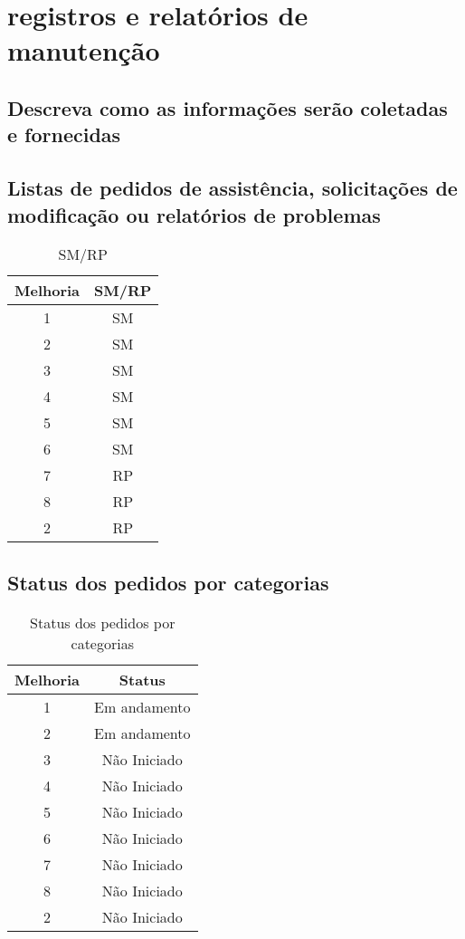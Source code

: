 \chapter{registros e relatórios de manutenção}

\section{Descreva como as informações serão coletadas e fornecidas}

\section{Listas de pedidos de assistência, solicitações de modificação ou relatórios de problemas}
\begin{table}[!htb]
	\caption[SMRP]{SM/RP}
	\label{tab:SMRP}
	\centering
	\begin{tabular}{c|c}
		Melhoria & SM/RP 	\\ \hline
		1    & SM    	\\
    2    & SM		\\
		3    & SM		\\
    4    & SM		\\
    5    & SM		\\
    6    & SM		\\
    7    & RP		\\
    8    & RP		\\
    2    & RP		\\
	\end{tabular}
\end{table}
\section{Status dos pedidos por categorias}
\begin{table}[!htb]
	\caption[Categoria]{Status dos pedidos por categorias}
	\label{tab:categoria}
	\centering
	\begin{tabular}{c|c}
		Melhoria & Status 	\\ \hline
		1    & Em andamento    	\\
    2    & Em andamento		\\
		3    & Não Iniciado		\\
    4    & Não Iniciado		\\
    5    & Não Iniciado		\\
    6    & Não Iniciado		\\
    7    & Não Iniciado		\\
    8    & Não Iniciado		\\
    2    & Não Iniciado		\\
	\end{tabular}
\end{table}
